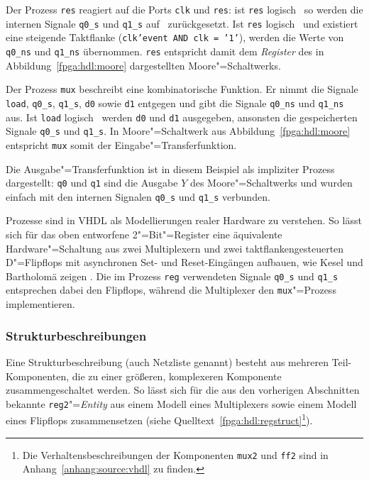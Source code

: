 Der Prozess \texttt{res} reagiert auf die Ports \texttt{clk} und \texttt{res}:
ist \texttt{res} logisch \grqq\, so werden die internen Signale
\texttt{q0\_s} und \texttt{q1\_s} auf \grqq\ zurückgesetzt. Ist
\texttt{res} logisch \grqq\ und existiert eine steigende Taktflanke
(\texttt{clk'event AND clk = '1'}), werden die Werte von \texttt{q0\_ns} und
\texttt{q1\_ns} übernommen. \texttt{res} entspricht damit dem \textit{Register}
des in Abbildung~\ref{fpga:hdl:moore} dargestellten Moore"=Schaltwerks.
\cite[vgl.][30--31]{kesel2013}

Der Prozess \texttt{mux} beschreibt eine kombinatorische Funktion. Er
nimmt die Signale \texttt{load}, \texttt{q0\_s}, \texttt{q1\_s},
\texttt{d0} sowie \texttt{d1} entgegen und gibt die Signale \texttt{q0\_ns} und
\texttt{q1\_ns} aus. Ist \texttt{load} logisch \grqq\, werden \texttt{d0}
und \texttt{d1} ausgegeben, ansonsten die gespeicherten Signale \texttt{q0\_s}
und \texttt{q1\_s}. In Moore"=Schaltwerk aus Abbildung~\ref{fpga:hdl:moore}
entspricht \texttt{mux} somit der Eingabe"=Transferfunktion.
\cite[vgl.][31]{kesel2013}

Die Ausgabe"=Transferfunktion ist in diesem Beispiel als impliziter Prozess
dargestellt: \texttt{q0} und \texttt{q1} sind die Ausgabe $Y$ des
Moore"=Schaltwerks und wurden einfach mit den internen Signalen \texttt{q0\_s}
und \texttt{q1\_s} verbunden.
\cite[vgl.][31]{kesel2013}

Prozesse sind in VHDL als Modellierungen realer Hardware zu verstehen. So lässt
sich für das oben entworfene 2"=Bit"=Register eine äquivalente
Hardware"=Schaltung aus zwei Multiplexern und zwei taktflankengesteuerten
D"=Flipflops mit asynchronen Set- und Reset-Eingängen aufbauen, wie Kesel und
Bartholomä zeigen \cite[siehe][32]{kesel2013}. Die im Prozess \texttt{reg}
verwendeten Signale \texttt{q0\_s} und \texttt{q1\_s} entsprechen dabei den
Flipflops, während die Multiplexer den \texttt{mux}"=Prozess implementieren.
\cite[vgl.][31]{kesel2013}

\subsubsection{Strukturbeschreibungen}

Eine Strukturbeschreibung (auch Netzliste genannt) besteht aus mehreren
Teil-Komponenten, die zu einer größeren, komplexeren Komponente 
zusammengeschaltet werden. So lässt sich für die aus den vorherigen Abschnitten
bekannte \texttt{reg2}"=\textit{Entity} aus einem Modell eines Multiplexers
sowie einem Modell eines Flipflops zusammensetzen (siehe
Quelltext~\ref{fpga:hdl:regstruct}\footnote{Die Verhaltensbeschreibungen der
Komponenten \texttt{mux2} und \texttt{ff2} sind in
Anhang~\ref{anhang:source:vhdl} zu finden.}).

